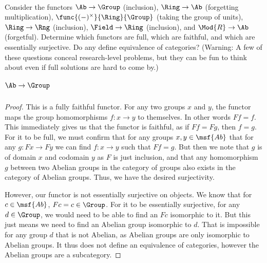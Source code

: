 \documentclass[../../main]{subfiles}
\begin{document}
\maketitle

\paragraph{}
\begin{exercise}
	Consider the functors \(\Ab\to\Group\) (inclusion), \(\Ring\to\Ab\)
	(forgetting multiplication), \(\func{(-)^\times}{\Ring}{\Group}\) (taking
	the group of units), \(\Ring\to\Rng\) (inclusion), \(\Field\to\Ring\)
	(inclusion), and \(\Mod{R}\to\Ab\) (forgetful). Determine which functors are
	full, which are faithful, and which are essentially surjective. Do any
	define equivalence of categories? (Warning: A few of these questions conceal
	research-level problems, but they can be fun to think about even if full
	solutions are hard to come by.)
\end{exercise}

\subparagraph{\(\Ab\to\Group\)}
\begin{proof}
	This is a fully faithful functor. For any two groups $x$ and $y$, the
	functor maps the group homomorphisms $f\colon x \rightarrow y$ to
	themselves.  In other words $Ff = f$.  This immediately gives us that the
	functor is faithful, as if $Ff = Fg$, then $f = g$. For it to be full, we
	must confirm that for any groups $x,y \in \msf{Ab}$ that for any $g\colon Fx
	\rightarrow Fy$ we can find $f\colon x \rightarrow y$ such that $Ff = g$.
	But then we note that $g$ is of domain $x$ and codomain $y$ as $F$ is just
	inclusion, and that any homomorphism $g$ between two Abelian groups in the
	category of groups also exists in the category of Abelian groups.  Thus, we
	have the desired surjectivity.

	However, our functor is not essentially surjective on objects.  We know that
	for $c \in \msf{Ab}$, $Fc = c \in\Group$.  For it to be essentially
	surjective, for any $d \in \Group$, we would need to be able to find an $Fc$
	isomorphic to it. But this just means we need to find an Abelian group
	isomorphic to $d$.  That is impossible for any group $d$ that is not
	Abelian, as Abelian groups are only isomorphic to Abelian groups. It thus
	does not define an equivalence of categories, however the Abelian groups are
	a subcategory.
\end{proof}
\end{document}
